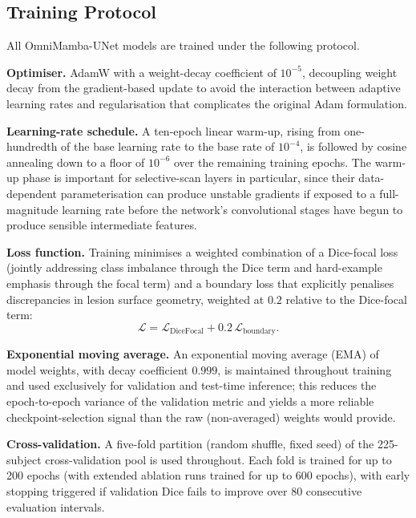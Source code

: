 \documentclass[pdflatex,sn-mathphys-num]{sn-jnl}
\begin{document}
\subsection{Training Protocol}\label{ssec:training}
All OmniMamba-UNet models are trained under the following protocol.

\textbf{Optimiser.} AdamW \citep{loshchilov2017decoupled} with a
weight-decay coefficient of $10^{-5}$, decoupling weight decay from the
gradient-based update to avoid the interaction between adaptive
learning rates and regularisation that complicates the original Adam
formulation.

\textbf{Learning-rate schedule.} A ten-epoch linear warm-up, rising
from one-hundredth of the base learning rate to the base rate of
$10^{-4}$, is followed by cosine annealing down to a floor of
$10^{-6}$ over the remaining training epochs. The warm-up phase is
important for selective-scan layers in particular, since their
data-dependent parameterisation can produce unstable gradients if
exposed to a full-magnitude learning rate before the network's
convolutional stages have begun to produce sensible intermediate
features.

\textbf{Loss function.} Training minimises a weighted combination of
a Dice-focal loss (jointly addressing class imbalance through the
Dice term and hard-example emphasis through the focal term) and a
boundary loss \citep{kervadec2019boundary} that explicitly penalises
discrepancies in lesion surface geometry, weighted at $0.2$ relative
to the Dice-focal term:
\begin{equation}
\mathcal{L} = \mathcal{L}_{\text{DiceFocal}} + 0.2\,\mathcal{L}_{\text{boundary}}.
\label{eq:loss}
\end{equation}

\textbf{Exponential moving average.} An exponential moving average
(EMA) of model weights, with decay coefficient $0.999$, is maintained
throughout training and used exclusively for validation and test-time
inference; this reduces the epoch-to-epoch variance of the validation
metric and yields a more reliable checkpoint-selection signal than the
raw (non-averaged) weights would provide.

\textbf{Cross-validation.} A five-fold partition (random shuffle,
fixed seed) of the 225-subject cross-validation pool is used
throughout. Each fold is trained for up to 200 epochs (with extended
ablation runs trained for up to 600 epochs), with early stopping
triggered if validation Dice fails to improve over 80 consecutive
evaluation intervals.
\end{document}

